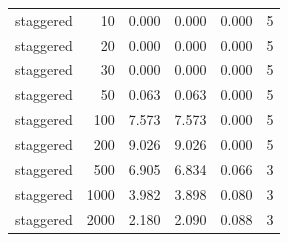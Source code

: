 \begin{table}[htbp]
\begin{tabular}{lrrrrr}
staggered & 10 & 0.000 & 0.000 & 0.000 & 5 \\
staggered & 20 & 0.000 & 0.000 & 0.000 & 5 \\
staggered & 30 & 0.000 & 0.000 & 0.000 & 5 \\
staggered & 50 & 0.063 & 0.063 & 0.000 & 5 \\
staggered & 100 & 7.573 & 7.573 & 0.000 & 5 \\
staggered & 200 & 9.026 & 9.026 & 0.000 & 5 \\
staggered & 500 & 6.905 & 6.834 & 0.066 & 3 \\
staggered & 1000 & 3.982 & 3.898 & 0.080 & 3 \\
staggered & 2000 & 2.180 & 2.090 & 0.088 & 3 \\
\bottomrule
\end{tabular}
\end{table}
